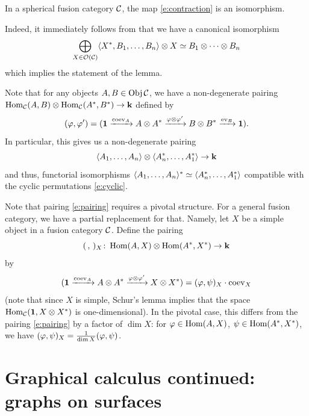 \begin{lemma}\label{l:contraction}
  In a spherical fusion category $\mathcal{C}$, the map \eqref{e:contraction} is an
  isomorphism.
\end{lemma}
Indeed, it immediately follows from  that we have a canonical
isomorphism
$$
  \bigoplus_{X\in\mathcal{O}(\mathcal{C})} \langle X^*, B_1, \dots, B_n\rangle\otimes X
  \simeq B_1\otimes \dots\otimes B_n
$$
which implies the statement of the lemma.

Note that for any objects $A,B\in \operatorname{Obj} \mathcal{C}$, we have a
non-degenerate pairing $\operatorname{Hom}_{\mathcal{C}}(A,B)\otimes \operatorname{Hom}_{\mathcal{C}}(A^*,B^*)\to \mathbf{k}$
defined by
\begin{equation}\label{e:pairing}
(\varphi, \varphi')=(\mathbf{1}\xrightarrow{\operatorname{coev}_A}A\otimes A^*\xrightarrow{\varphi\otimes \varphi'}
  B\otimes B^*\xrightarrow{\operatorname{ev}_B}\mathbf{1}).
\end{equation}
In particular, this gives us a non-degenerate pairing
\begin{equation}\label{e:dual}
\langle A_1,\dots,A_n\rangle\otimes \langle A_n^*,\dots,A_1^*\rangle\to \mathbf{k}
\end{equation}
and thus, functorial isomorphisms $\langle A_1,\dots,A_n\rangle^*\simeq
\langle A_n^*,\dots,A_1^*\rangle$ compatible with the cyclic permutations
\eqref{e:cyclic}.

\begin{remark}\label{r:pairing-nonpivotal}
  Note that pairing \eqref{e:pairing} requires a pivotal structure. For a
  general fusion category, we have a partial replacement for that. Namely, let
  $X$ be a simple object in a fusion category $\mathcal{C}$. Define the pairing
  \begin{equation}\label{e:pairing2}
  (\, , \,)_X\colon \operatorname{Hom}(A,X)\otimes \operatorname{Hom}(A^*, X^*)\to \mathbf{k}
  \end{equation}
  by
  $$
    (\mathbf{1}\xrightarrow{\operatorname{coev}_A}A\otimes A^*\xrightarrow{\varphi\otimes \varphi'}X\otimes X^*)
    = (\varphi, \psi)_X \cdot \operatorname{coev}_X
  $$
  (note that since $X$ is simple, Schur's lemma implies that the space
  $\operatorname{Hom}_{\mathcal{C}}(\mathbf{1}, X\otimes X^*)$ is one-dimensional). In the pivotal case,
  this differs from the pairing \eqref{e:pairing} by a factor of $\dim X$:
  for $\varphi\in \operatorname{Hom}(A,X)$, $\psi\in\operatorname{Hom}(A^*,X^*)$, we have
  $(\varphi,\psi)_X=\frac{1}{\dim X} (\varphi,\psi)$.
\end{remark}
\section{Graphical calculus continued: graphs on surfaces}\label{s:graphical2}

